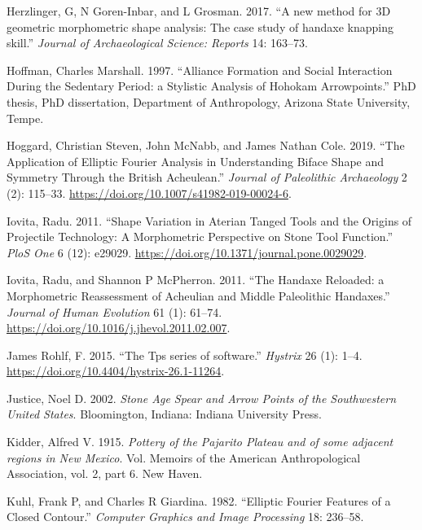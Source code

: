 \documentclass{article}
\newlength{\cslhangindent}
\newlength{\cslentryspacingunit} %
\newenvironment{CSLReferences}[2] %
 {%
  \setlength{\parindent}{0pt}
  \ifodd #1
  \let\oldpar\par
  \def\par{\hangindent=\cslhangindent\oldpar}
  \fi
  \setlength{\parskip}{#2\cslentryspacingunit}
 }%
 {}
\begin{document}
\begin{CSLReferences}{1}{0}
\leavevmode{}%
Herzlinger, G, N Goren-Inbar, and L Grosman. 2017. {``{A new method for
3D geometric morphometric shape analysis: The case study of handaxe
knapping skill}.''} \emph{Journal of Archaeological Science: Reports}
14: 163--73.

\leavevmode{}%
Hoffman, Charles Marshall. 1997. {``{Alliance Formation and Social
Interaction During the Sedentary Period: a Stylistic Analysis of Hohokam
Arrowpoints}.''} PhD thesis, PhD dissertation, Department of
Anthropology, Arizona State University, Tempe.

\leavevmode{}%
Hoggard, Christian Steven, John McNabb, and James Nathan Cole. 2019.
{``{The Application of Elliptic Fourier Analysis in Understanding Biface
Shape and Symmetry Through the British Acheulean}.''} \emph{Journal of
Paleolithic Archaeology} 2 (2): 115--33.
\url{https://doi.org/10.1007/s41982-019-00024-6}.

\leavevmode{}%
Iovita, Radu. 2011. {``{Shape Variation in Aterian Tanged Tools and the
Origins of Projectile Technology: A Morphometric Perspective on Stone
Tool Function}.''} \emph{PloS One} 6 (12): e29029.
\url{https://doi.org/10.1371/journal.pone.0029029}.

\leavevmode{}%
Iovita, Radu, and Shannon P McPherron. 2011. {``{The Handaxe Reloaded: a
Morphometric Reassessment of Acheulian and Middle Paleolithic
Handaxes}.''} \emph{Journal of Human Evolution} 61 (1): 61--74.
\url{https://doi.org/10.1016/j.jhevol.2011.02.007}.

\leavevmode{}%
James Rohlf, F. 2015. {``{The Tps series of software}.''} \emph{Hystrix}
26 (1): 1--4. \url{https://doi.org/10.4404/hystrix-26.1-11264}.

\leavevmode{}%
Justice, Noel D. 2002. \emph{Stone Age Spear and Arrow Points of the
Southwestern United States}. Bloomington, Indiana: Indiana University
Press.

\leavevmode{}%
Kidder, Alfred V. 1915. \emph{{Pottery of the Pajarito Plateau and of
some adjacent regions in New Mexico}}. Vol. Memoirs of the American
Anthropological Association, vol. 2, part 6. New Haven.

\leavevmode{}%
Kuhl, Frank P, and Charles R Giardina. 1982. {``{Elliptic Fourier
Features of a Closed Contour}.''} \emph{Computer Graphics and Image
Processing} 18: 236--58.


\end{CSLReferences}
\end{document}
